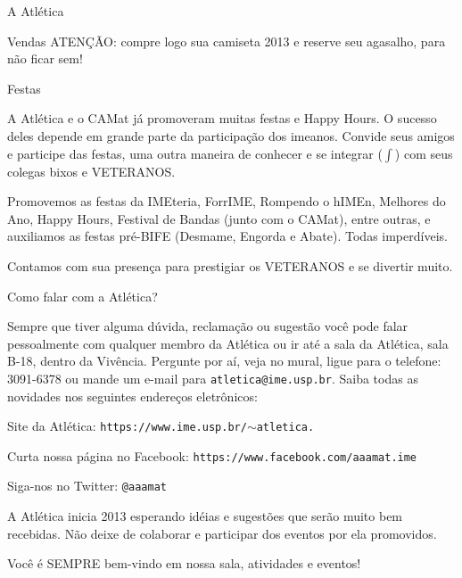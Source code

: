 \begin{secao}{A Atlética}
\begin{subsecao}{Vendas}
ATENÇÃO: compre logo sua camiseta 2013 e reserve seu agasalho, para não ficar 
sem!

\end{subsecao}
\begin{subsecao}{Festas}

A Atlética e o CAMat já promoveram muitas festas e Happy Hours. O sucesso
deles depende em grande parte da participação dos imeanos. Convide seus
amigos e participe das festas, uma outra maneira de conhecer e se
integrar ($\int$) com seus colegas bixos e VETERANOS.

Promovemos as festas da IMEteria, ForrIME, Rompendo o hIMEn, Melhores do Ano, 
Happy Hours, Festival de Bandas (junto com o CAMat), entre outras, e auxiliamos 
as festas pré-BIFE (Desmame, Engorda e Abate). Todas imperdíveis.

Contamos com sua presença para prestigiar os VETERANOS e se divertir muito.

\end{subsecao}
\begin{subsecao}{Como falar com a Atlética?}

Sempre que tiver alguma dúvida, reclamação ou sugestão você pode falar
pessoalmente com qualquer membro da Atlética ou ir até a sala da Atlética, sala
B-18, dentro da Vivência. Pergunte por aí, veja no mural, ligue para o
telefone: 3091-6378 ou mande um e-mail para {\tt atletica@ime.usp.br}.
Saiba todas as novidades nos seguintes endereços eletrônicos:

Site da Atlética: {\tt https://www.ime.usp.br/$\sim$atletica.}

Curta nossa página no Facebook: {\tt https://www.facebook.com/aaamat.ime}

Siga-nos no Twitter: {\tt @aaamat}

A Atlética inicia 2013 esperando idéias e sugestões que serão muito bem
recebidas. Não deixe de colaborar e participar dos eventos por ela promovidos.

Você é SEMPRE bem-vindo em nossa sala, atividades e eventos!

\end{subsecao}
\end{secao}
